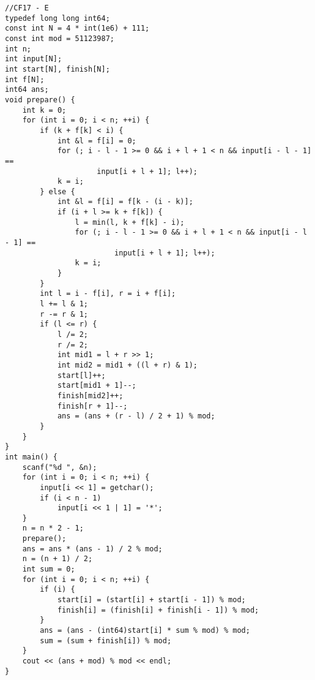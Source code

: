 \begin{lstlisting}
//CF17 - E
typedef long long int64;
const int N = 4 * int(1e6) + 111;
const int mod = 51123987;
int n;
int input[N];
int start[N], finish[N];
int f[N];
int64 ans;
void prepare() {
	int k = 0;
	for (int i = 0; i < n; ++i) {
		if (k + f[k] < i) {
			int &l = f[i] = 0;
			for (; i - l - 1 >= 0 && i + l + 1 < n && input[i - l - 1] ==
					 input[i + l + 1]; l++);
			k = i;
		} else {
			int &l = f[i] = f[k - (i - k)];
			if (i + l >= k + f[k]) {
				l = min(l, k + f[k] - i);
				for (; i - l - 1 >= 0 && i + l + 1 < n && input[i - l - 1] ==
						 input[i + l + 1]; l++);
				k = i;
			}
		}
		int l = i - f[i], r = i + f[i];
		l += l & 1;
		r -= r & 1;
		if (l <= r) {
			l /= 2;
			r /= 2;
			int mid1 = l + r >> 1;
			int mid2 = mid1 + ((l + r) & 1);
			start[l]++;
			start[mid1 + 1]--;
			finish[mid2]++;
			finish[r + 1]--;
			ans = (ans + (r - l) / 2 + 1) % mod;
		}
	}
}
int main() {
	scanf("%d ", &n);
	for (int i = 0; i < n; ++i) {
		input[i << 1] = getchar();
		if (i < n - 1)
			input[i << 1 | 1] = '*';
	}
	n = n * 2 - 1;
	prepare();
	ans = ans * (ans - 1) / 2 % mod;
	n = (n + 1) / 2;
	int sum = 0;
	for (int i = 0; i < n; ++i) {
		if (i) {
			start[i] = (start[i] + start[i - 1]) % mod;
			finish[i] = (finish[i] + finish[i - 1]) % mod;
		}
		ans = (ans - (int64)start[i] * sum % mod) % mod;
		sum = (sum + finish[i]) % mod;
	}
	cout << (ans + mod) % mod << endl;
}
	\end{lstlisting}
